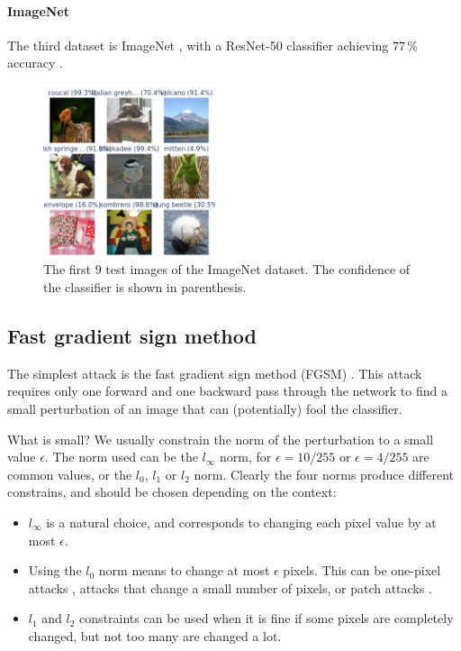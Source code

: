 \documentclass[]{scrarticle}
\begin{document}
\paragraph{ImageNet}
The third dataset is ImageNet \cite{Deng2009ImageNetAL}, with a ResNet-50 classifier
achieving $77\,\%$ accuracy \cite{He2015DeepRL}.

\begin{figure}[h]
  \centering
  \includegraphics[width=0.45\textwidth]{images/sample_ImageNet.png}
  \caption{The first 9 test images of the ImageNet dataset.
    The confidence of the classifier is shown in parenthesis.}
  \label{fig:imagenet_samples}
\end{figure}


\subsection{Fast gradient sign method}
The simplest attack is the fast gradient sign method (FGSM) \cite{goodfellow2014explaining}.
This attack requires only one forward and one backward pass through the network
to find a small perturbation of an image that can (potentially) fool the classifier.

What is small? We usually constrain the norm of the perturbation to
a small value $\epsilon$. The norm used can be the $l_\infty$ norm,
for $\epsilon = 10 / 255$ or $\epsilon = 4 / 255$ are common values,
or the $l_0$, $l_1$ or $l_2$ norm.
Clearly the four norms produce different constrains, and should be chosen
depending on the context:
\begin{itemize}
  \item $l_\infty$ is a natural choice, and corresponds to changing each
    pixel value by at most $\epsilon$.
  \item Using the $l_0$ norm means to change at most $\epsilon$ pixels. This
    can be one-pixel attacks \cite{Su2017OnePA},
    attacks that change a small number of pixels,
    or patch attacks \cite{Brown2017AdversarialP}.
  \item $l_1$ and $l_2$ constraints can be used when it is fine if
    some pixels are completely changed, but not too many are changed
    a lot.
\end{itemize}
\end{document}
